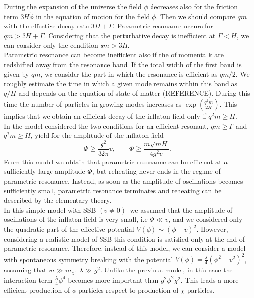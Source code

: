 \documentclass[11pt,a4paper,twoside]{book}
\begin{document}
During the expansion of the universe the field $\phi$ decreases also for the friction term $ 3H\dot{\phi} $ in the equation of motion for the field $\phi$. Then we should compare $ qm $ with the effective decay rate $ 3H + \Gamma $. Parametric resonance occurs for $ qm > 3H + \Gamma $. Considering that the perturbative decay is inefficient at $ \Gamma < H $, we can consider only the condition $ qm > 3H $.\\
Parametric resonance can become inefficient also if the of momenta k are redshifted away from the resonance band. If the total width of the first band is given by $ qm $, we consider the part in which the resonance is efficient as $ qm/2 $. We roughly estimate the time in which a given mode remains within this band as $ q/H $ and depends on the equation of state of matter (REFERENCE). During this time the number of particles in growing modes increases as $ \exp(\frac{q^{2}m}{2H}) $. This implies that we obtain an efficient decay of the inflaton field only if $ q^{2}m \ge H $. \\
In the model considered the two conditions for an efficient resonant, $ qm \ge \Gamma $ and $ q^{2}m \ge H $, yield for the amplitude of the inflaton field
\begin{equation}
\label{Chap4:conditionAmplitudeField}
\Phi \ge \frac{g^{2}}{32\pi}v, \qquad  \Phi \ge \frac{m\sqrt{mH}}{4g^{2}v}.
\end{equation}
From this model we obtain that parametric resonance can be efficient at a sufficiently large  amplitude $\Phi$, but reheating never ends in the regime of parametric resonance. Instead, as soon as the amplitude of oscillations becomes sufficiently  small, parametric resonance terminates and reheating can be described by the elementary theory.\\
In this simple model with SSB $ (v \neq 0) $, we assumed that the amplitude of oscillations of the inflaton field is very small, i.e $ \Phi \ll v $, and we considered only the quadratic part of the effective potential $ V(\phi) \sim (\phi - v)^{2} $. However, considering a realistic model of SSB this condition is satisfied only at the end of parametric resonance. Therefore, instead of this model, we can consider a model with spontaneous symmetry breaking with the potential $ V(\phi)=\frac{\lambda}{4}(\phi^{2}-v^{2})^{2} $, assuming that $ m \gg m_{\chi},\ \lambda \gg g^{2} $. Unlike the previous model, in this case the interaction term $\frac{\lambda}{4}\phi^{4}  $ becomes more important than $ g^{2}\phi^{2}\chi^{2} $. This leads a more efficient production of $ \phi $-particles respect to production of $ \chi $-particles.\\
\end{document}
